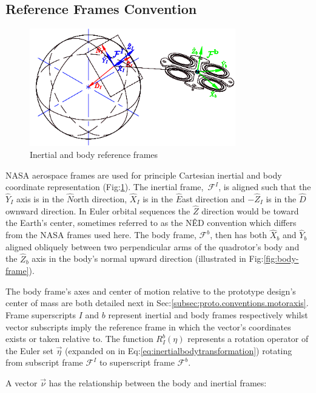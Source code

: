 \subsection{Reference Frames Convention}
\label{subsec:proto.conventions.frames}
\begin{figure}[htbp]
\centering
\includegraphics[width=0.8\textwidth]{figs/reference-frame}
\caption{Inertial and body reference frames}
\label{fig:ref_frame}
\end{figure}
NASA aerospace frames are used for principle Cartesian inertial and body coordinate representation (Fig:\ref{fig:ref_frame}). The inertial frame,~$\mathcal{F}^I$, is aligned such that the $\hat{Y}_I$ axis is in the $\hat{N}$orth direction, $\hat{X}_I$ is in the $\hat{E}$ast direction and $-\hat{Z}_I$ is  in the $\hat{D}$ownward direction. In Euler orbital sequences the $\hat{Z}$ direction would be toward the Earth's center, sometimes referred to as the N\^{E}D convention which differs from the NASA frames used here. The body frame, $\mathcal{F}^b$, then has both $\hat{X}_b$ and $\hat{Y}_b$ aligned obliquely between two perpendicular arms of the quadrotor's body and the $\hat{Z}_b$ axis in the body's normal upward direction (illustrated in Fig:\ref{fig:body-frame}). 
\par
The body frame's axes and center of motion relative to the prototype design's center of mass are both detailed next in Sec:\ref{subsec:proto.conventions.motoraxis}. Frame superscripts $I$ and $b$ represent inertial and body frames respectively whilst vector subscripts imply the reference frame in which the vector's coordinates exists or taken relative to. The function $R_I^b(\eta)$ represents a rotation operator of the Euler set $\vec{\eta}$ (expanded on in Eq:\ref{eq:inertialbodytransformation}) rotating from subscript frame $\mathcal{F}^I$ to superscript frame $\mathcal{F}^b$. 
\par
A vector $\vec{\nu}$ has the relationship between the body and inertial frames:
